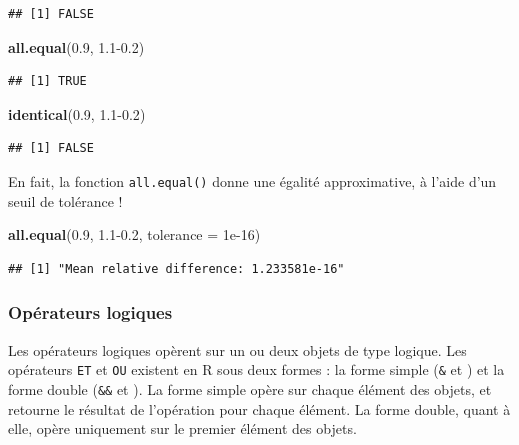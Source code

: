 \documentclass[
  11pt,
]{book}
\newenvironment{Shaded}{\begin{snugshade}}{\end{snugshade}}
\newcommand{\DataTypeTok}[1]{\textcolor[rgb]{0.13,0.29,0.53}{#1}}
\newcommand{\FloatTok}[1]{\textcolor[rgb]{0.00,0.00,0.81}{#1}}
\newcommand{\KeywordTok}[1]{\textcolor[rgb]{0.13,0.29,0.53}{\textbf{#1}}}
\newcommand{\NormalTok}[1]{#1}
\numberwithin{equation}{section}
\numberwithin{countremarque}{section}
\begin{document}
\begin{lstlisting}
## [1] FALSE
\end{lstlisting}

\begin{Shaded}
\begin{Highlighting}[]
\KeywordTok{all.equal}\NormalTok{(}\FloatTok{0.9}\NormalTok{, }\FloatTok{1.1{-}0.2}\NormalTok{)}
\end{Highlighting}
\end{Shaded}

\begin{lstlisting}
## [1] TRUE
\end{lstlisting}

\begin{Shaded}
\begin{Highlighting}[]
\KeywordTok{identical}\NormalTok{(}\FloatTok{0.9}\NormalTok{, }\FloatTok{1.1{-}0.2}\NormalTok{)}
\end{Highlighting}
\end{Shaded}

\begin{lstlisting}
## [1] FALSE
\end{lstlisting}

En fait, la fonction \texttt{all.equal()} donne une égalité approximative, à l'aide d'un seuil de tolérance !

\begin{Shaded}
\begin{Highlighting}[]
\KeywordTok{all.equal}\NormalTok{(}\FloatTok{0.9}\NormalTok{, }\FloatTok{1.1{-}0.2}\NormalTok{, }\DataTypeTok{tolerance =} \FloatTok{1e{-}16}\NormalTok{)}
\end{Highlighting}
\end{Shaded}

\begin{lstlisting}
## [1] "Mean relative difference: 1.233581e-16"
\end{lstlisting}

\hypertarget{opuxe9rateurs-logiques}{%
\subsubsection{Opérateurs logiques}\label{opuxe9rateurs-logiques}}

Les opérateurs logiques opèrent sur un ou deux objets de type logique. Les opérateurs \texttt{ET} et \texttt{OU} existent en R sous deux formes : la forme simple (\texttt{\&} et \texttt{\textbar{}}) et la forme double (\texttt{\&\&} et \texttt{\textbar{}\textbar{}}). La forme simple opère sur chaque élément des objets, et retourne le résultat de l'opération pour chaque élément. La forme double, quant à elle, opère uniquement sur le premier élément des objets.
\end{document}
